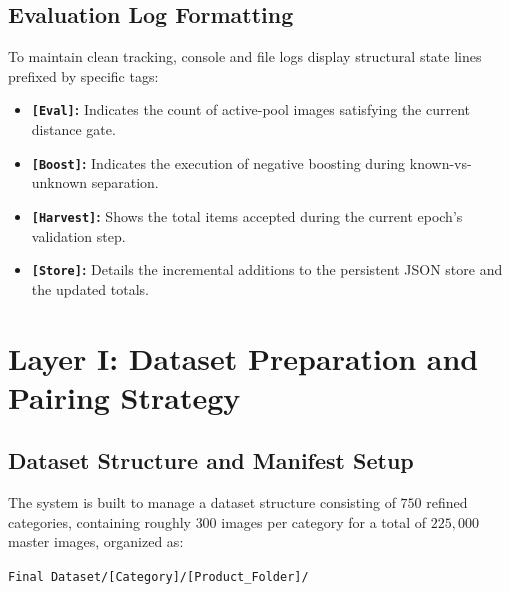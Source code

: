 \documentclass[11pt,a4paper]{article}
\begin{document}
\begin{table}[htbp]
\centering
\caption{Amazon Category and Product Coverage}
\label{tab:amazon_coverage}
\end{table}

\subsection{Evaluation Log Formatting}
To maintain clean tracking, console and file logs display structural state lines prefixed by specific tags:
\begin{itemize}
    \item \textbf{\texttt{[Eval]}:} Indicates the count of active-pool images satisfying the current distance gate.
    \item \textbf{\texttt{[Boost]}:} Indicates the execution of negative boosting during known-vs-unknown separation.
    \item \textbf{\texttt{[Harvest]}:} Shows the total items accepted during the current epoch's validation step.
    \item \textbf{\texttt{[Store]}:} Details the incremental additions to the persistent JSON store and the updated totals.
\end{itemize}

\section{Layer I: Dataset Preparation and Pairing Strategy}

\subsection{Dataset Structure and Manifest Setup}
The system is built to manage a dataset structure consisting of $750$ refined categories, containing roughly $300$ images per category for a total of $225,000$ master images, organized as:
\begin{center}
    \texttt{Final Dataset/[Category]/[Product\_Folder]/}
\end{center}
\end{document}
